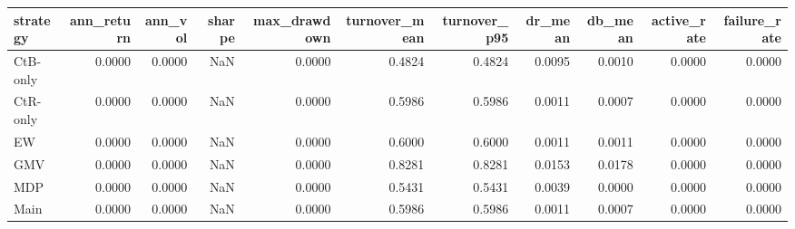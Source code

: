 \begin{tabular}{lrrrrrrrrrr}
\toprule
strategy & ann_return & ann_vol & sharpe & max_drawdown & turnover_mean & turnover_p95 & dr_mean & db_mean & active_rate & failure_rate \\
\midrule
CtB-only & 0.0000 & 0.0000 & NaN & 0.0000 & 0.4824 & 0.4824 & 0.0095 & 0.0010 & 0.0000 & 0.0000 \\
CtR-only & 0.0000 & 0.0000 & NaN & 0.0000 & 0.5986 & 0.5986 & 0.0011 & 0.0007 & 0.0000 & 0.0000 \\
EW & 0.0000 & 0.0000 & NaN & 0.0000 & 0.6000 & 0.6000 & 0.0011 & 0.0011 & 0.0000 & 0.0000 \\
GMV & 0.0000 & 0.0000 & NaN & 0.0000 & 0.8281 & 0.8281 & 0.0153 & 0.0178 & 0.0000 & 0.0000 \\
MDP & 0.0000 & 0.0000 & NaN & 0.0000 & 0.5431 & 0.5431 & 0.0039 & 0.0000 & 0.0000 & 0.0000 \\
Main & 0.0000 & 0.0000 & NaN & 0.0000 & 0.5986 & 0.5986 & 0.0011 & 0.0007 & 0.0000 & 0.0000 \\
\bottomrule
\end{tabular}
